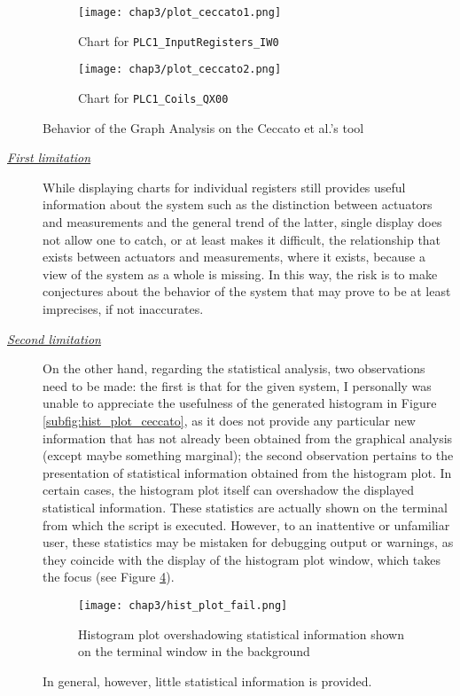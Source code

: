 \begin{figure}[ht]
	\centering
	\begin{subfigure}{0.48\textwidth}
		\texttt{[image: chap3/plot\_ceccato1.png]}
		\caption{Chart for \texttt{PLC1\_InputRegisters\_IW0}}
		\label{subfig:3_real_plot_ceccato_1}
	\end{subfigure}
	\hfill
	\begin{subfigure}{0.48\textwidth}
		\texttt{[image: chap3/plot\_ceccato2.png]}
		\caption{Chart for \texttt{PLC1\_Coils\_QX00}}
		\label{subfig:3_real_plot_ceccato_2}
	\end{subfigure}
	\caption{Behavior of the Graph Analysis on the Ceccato et al.'s tool}
	\label{fig:3_ceccato_graphs_behavior}
\end{figure}

\begin{description}
	\item[\emph{\underline{First limitation}}] While displaying charts for individual registers still provides useful information about the system such as the distinction between actuators and measurements and the general trend of the latter, single display does not allow one to catch, or at least makes it difficult, the relationship that exists between actuators and measurements, where it exists, because a view of the system as a whole is missing.\newline
	In this way, the risk is to make conjectures about the behavior of the system that may prove to be at least imprecises, if not inaccurates.

	\item[\emph{\underline{Second limitation}}] On the other hand, regarding the statistical analysis, two observations need to be made: the first is that for the given system, I personally was unable to appreciate the usefulness of the generated histogram in Figure \ref{subfig:hist_plot_ceccato}, as it does not provide any particular new information that has not already been obtained from the graphical analysis (except maybe something marginal); the second observation pertains to the presentation of statistical information obtained from the histogram plot. In certain cases, the histogram plot itself can overshadow the displayed statistical information. These statistics are actually shown on the terminal from which the script is executed. However, to an inattentive or unfamiliar user, these statistics may be mistaken for debugging output or warnings, as they coincide with the display of the histogram plot window, which takes the focus (see Figure \ref{fig:3_hist_plot_fail}).\newline

	\begin{figure}[ht]
		\centering
		\texttt{[image: chap3/hist\_plot\_fail.png]}
		\caption{Histogram plot overshadowing statistical information shown on the terminal window in the background}
		\label{fig:3_hist_plot_fail}
	\end{figure}

	\noindent In general, however, little statistical information is provided.
\end{description}

